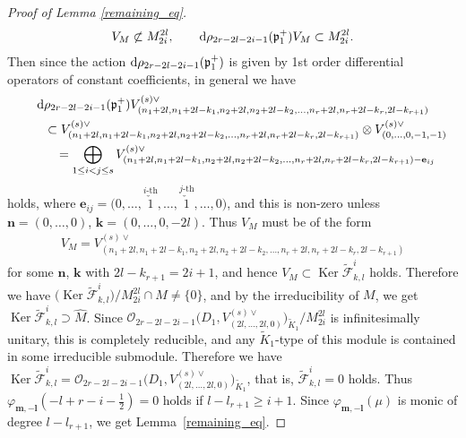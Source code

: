 \documentclass[pdftex]{sigma}
\numberwithin{equation}{section}
\newcommand{\be}{\mathbf{e}}
\newcommand{\bk}{\mathbf{k}}
\newcommand{\bl}{\mathbf{l}}
\newcommand{\bm}{\mathbf{m}}
\newcommand{\bn}{\mathbf{n}}
\newcommand{\fp}{\mathfrak{p}}
\newcommand{\cF}{\mathcal{F}}
\newcommand{\cO}{\mathcal{O}}
\begin{document}
\begin{proof}[Proof of Lemma \ref{remaining_eq}]
\begin{gather*} V_M\not\subset M_{2i}^{2l}, \qquad {\rm d}\rho_{2r-2l-2i-1}(\fp^+_1)V_M\subset M_{2i}^{2l}. \end{gather*}
Then since the action ${\rm d}\rho_{2r-2l-2i-1}(\fp^+_1)$ is given by 1st order differential operators of constant coefficients, in general we have
\begin{gather*}
 {\rm d}\rho_{2r-2l-2i-1}(\fp^+_1)V_{(n_1+2l,n_1+2l-k_1,n_2+2l,n_2+2l-k_2,\ldots,n_r+2l,n_r+2l-k_r,2l-k_{r+1})}^{(s)\vee} \\
 \qquad{} \subset V_{(n_1+2l,n_1+2l-k_1,n_2+2l,n_2+2l-k_2,\ldots,n_r+2l,n_r+2l-k_r,2l-k_{r+1})}^{(s)\vee}\otimes V_{(0,\ldots,0,-1,-1)}^{(s)\vee} \\
 \qquad{} =\bigoplus_{1\le i<j\le s}V_{(n_1+2l,n_1+2l-k_1,n_2+2l,n_2+2l-k_2,\ldots,n_r+2l,n_r+2l-k_r,2l-k_{r+1})-\be_{ij}}^{(s)\vee}
\end{gather*}
holds, where $\be_{ij}=\big(0,\ldots,\overset{i\text{-th}}{\check{1}},\ldots,\overset{j\text{-th}}{\check{1}},\ldots,0\big)$,
and this is non-zero unless $\bn=(0,\ldots,0)$, $\bk=(0,\ldots,0,-2l)$. Thus $V_M$ must be of the form
\begin{gather*} V_M=V_{(n_1+2l,n_1+2l-k_1,n_2+2l,n_2+2l-k_2,\ldots,n_r+2l,n_r+2l-k_r,2l-k_{r+1})}^{(s)\vee} \end{gather*}
for some $\bn$, $\bk$ with $2l-k_{r+1}=2i+1$, and hence $V_M\subset\operatorname{Ker}\tilde{\cF}_{k,l}^i$ holds. Therefore we have $\big(\operatorname{Ker}\tilde{\cF}_{k,l}^i\big)/M_{2i}^{2l}\cap M\ne \{0\}$,
and by the irreducibility of $M$, we get $\operatorname{Ker}\tilde{\cF}_{k,l}^i\supset \hat{M}$. Since $\cO_{2r-2l-2i-1}\big(D_1,V_{(2l,\dots,2l,0)}^{(s)\vee}\big)_{\tilde{K}_1}/M_{2i}^{2l}$ is infinitesimally unitary,
this is completely reducible, and any $\tilde{K}_1$-type of this module is contained in some irreducible submodule. Therefore we have $\operatorname{Ker}\tilde{\cF}_{k,l}^i=\cO_{2r-2l-2i-1}\big(D_1,V_{(2l,\dots,2l,0)}^{(s)\vee}\big)_{\tilde{K}_1}$, that is, $\tilde{\cF}_{k,l}^i=0$ holds. Thus $\varphi_{\bm,-\bl}\left(-l+r-i-\frac{1}{2}\right)\allowbreak=0$ holds if $l-l_{r+1}\ge i+1$. Since $\varphi_{\bm,-\bl}(\mu)$ is monic of degree $l-l_{r+1}$, we get Lemma~\ref{remaining_eq}.
\end{proof}
\end{document}
